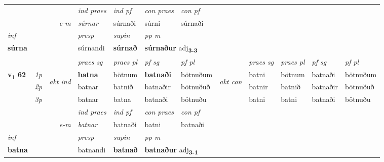 \begin{longtable}[l]{X>{\footnotesize\itshape}llXXXXlXXXX}
   && &  \textit{ind praes} & \textit{ind pf} & \textit{con praes} & \textit{con pf} \\*
\multicolumn{3}{r}{\textit{e-m}} & súrnar & súrnaði & súrni & súrnaði \\*

\cmidrule{4-7}
   {\textit{inf}} & &     & \textit{presp} & \textit{supin}  & \textit{pp m} \\*
  {\textbf{súrna}} & &     & súrnandi &  \textbf{súrnað}  & \multicolumn{2}{l}{\textbf{súrnaður} adj\textbf{\textsubscript{3-3}}} \\*

\midrule

 & &   & \textit{praes sg}  & \textit{praes pl}    & \textit{ pf sg} & \textit{pf pl} & & \textit{praes sg}  & \textit{praes pl}    & \textit{pf sg} & \textit{pf pl }  \\ \cmidrule{4-7} \cmidrule{9-12}
 \multirow{2}{*}{{{\textbf{v{\textsubscript{1}}} \Large{\textbf{62}}}}}  & 1p & \multirow{3}{*}{\begin{turn}{90}\textit{akt ind}\end{turn}} & \textbf{batna} & bötnum & \textbf{batnaði} & bötnuðum & \multirow{3}{*}{\begin{turn}{90}\textit{akt con}\end{turn}} &batni & bötnum & batnaði & bötnuðum\\*
 & 2p &  &  batnar  & batnið & batnaðir & bötnuðuð & & batnir & batnið & batnaðir & bötnuðuð \\*
 & 3p &  & batnar & batna & batnaði & bötnuðu & & batni & batni& batnaði & bötnuðu \\*
\cmidrule{4-7} \cmidrule{9-12}

   && &  \textit{ind praes} & \textit{ind pf} & \textit{con praes} & \textit{con pf} \\*
\multicolumn{3}{r}{\textit{e-m}} & batnar & batnaði & batni & batnaði \\*

\cmidrule{4-7}
   {\textit{inf}} & &     & \textit{presp} & \textit{supin}  & \textit{pp m} \\*
  {\textbf{batna}} & &     & batnandi &  \textbf{batnað}  & \multicolumn{2}{l}{\textbf{batnaður} adj\textbf{\textsubscript{3-1}}} \\*

\midrule


\end{longtable}
